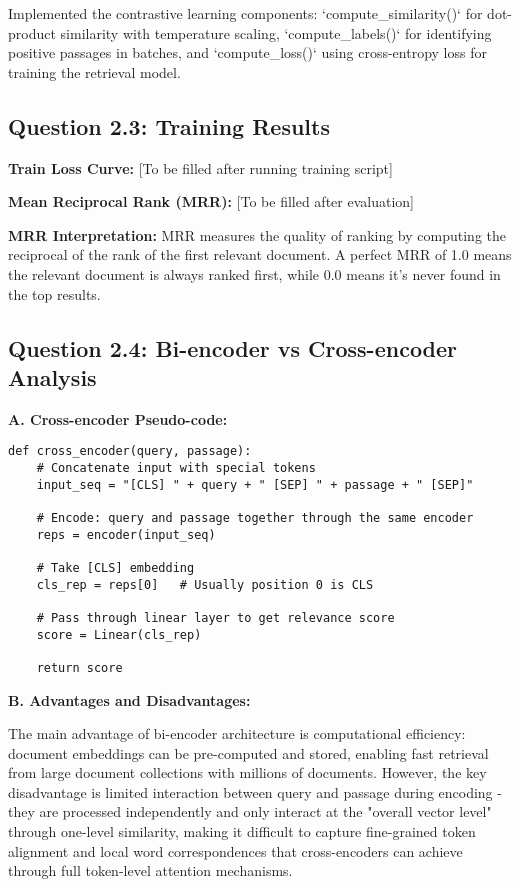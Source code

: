 \documentclass[11pt]{article}
\begin{document}
Implemented the contrastive learning components: `compute_similarity()` for dot-product similarity with temperature scaling, `compute_labels()` for identifying positive passages in batches, and `compute_loss()` using cross-entropy loss for training the retrieval model.

\subsection{Question 2.3: Training Results}

\textbf{Train Loss Curve:} [To be filled after running training script]

\textbf{Mean Reciprocal Rank (MRR):} [To be filled after evaluation]

\textbf{MRR Interpretation:} MRR measures the quality of ranking by computing the reciprocal of the rank of the first relevant document. A perfect MRR of 1.0 means the relevant document is always ranked first, while 0.0 means it's never found in the top results.

\subsection{Question 2.4: Bi-encoder vs Cross-encoder Analysis}

\textbf{A. Cross-encoder Pseudo-code:}

\begin{verbatim}
def cross_encoder(query, passage):
    # Concatenate input with special tokens
    input_seq = "[CLS] " + query + " [SEP] " + passage + " [SEP]"
    
    # Encode: query and passage together through the same encoder
    reps = encoder(input_seq)
    
    # Take [CLS] embedding
    cls_rep = reps[0]   # Usually position 0 is CLS
    
    # Pass through linear layer to get relevance score
    score = Linear(cls_rep)
    
    return score
\end{verbatim}

\textbf{B. Advantages and Disadvantages:}

The main advantage of bi-encoder architecture is computational efficiency: document embeddings can be pre-computed and stored, enabling fast retrieval from large document collections with millions of documents. However, the key disadvantage is limited interaction between query and passage during encoding - they are processed independently and only interact at the "overall vector level" through one-level similarity, making it difficult to capture fine-grained token alignment and local word correspondences that cross-encoders can achieve through full token-level attention mechanisms.
\end{document}
